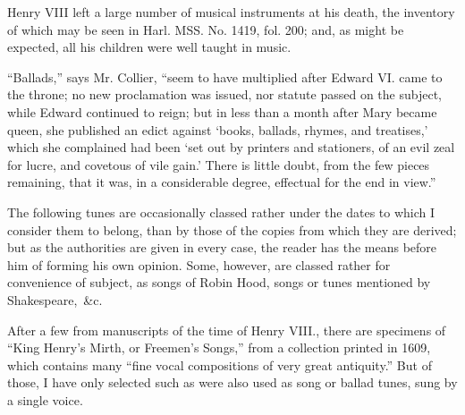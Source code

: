 Henry VIII left a large number of musical instruments at his death, the inventory
of which may be seen in Harl. MSS. No. 1419, fol. 200; and, as might
be expected, all his children were well taught in music.

“Ballads,” says Mr. Collier, “seem to have multiplied after Edward VI. came
to the throne; no new proclamation was issued, nor statute passed on the subject,
while Edward continued to reign; but in less than a month after Mary became
queen, she published an edict against ‘books, ballads, rhymes, and treatises,’
which she complained had been ‘set out by printers and stationers, of an evil
zeal for lucre, and covetous of vile gain.’ There is little doubt, from the few
pieces remaining, that it was, in a considerable degree, effectual for the end
in view.”

\vfill
\centerrule
\vfill

The following tunes are occasionally classed rather under the dates to which
I consider them to belong, than by those of the copies from which they are derived;
but as the authorities are given in every case, the reader has the means before him
of forming his own opinion. Some, however, are classed rather for convenience of
subject, as songs of Robin Hood, songs or tunes mentioned by Shakespeare,~\&c.

After a few from manuscripts of the time of Henry VIII., there are specimens
of “King Henry’s Mirth, or Freemen’s Songs,” from a collection printed in 1609,
which contains many “fine vocal compositions of very great antiquity.” But
of those, I have only selected such as were also used as song or ballad tunes,
sung by a single voice.

\pagebreak

